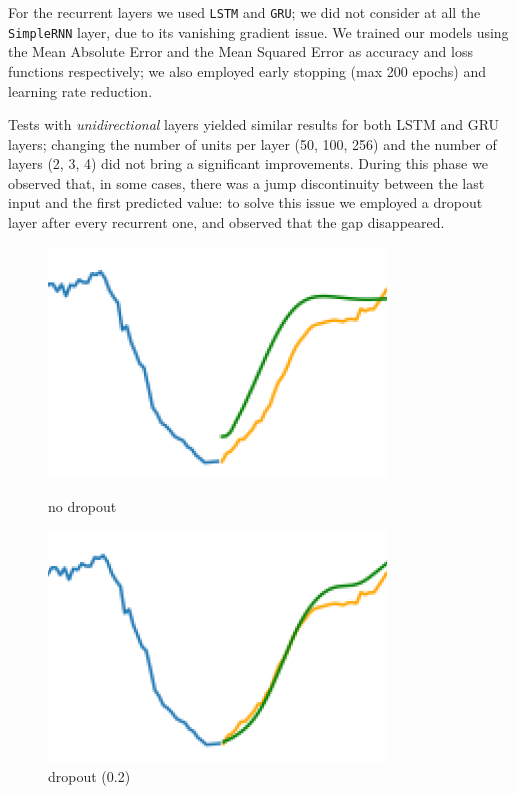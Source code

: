\documentclass[10.5pt,a4paper,twocolumn]{article}
\begin{document}
For the recurrent layers we used \texttt{LSTM} and \texttt{GRU};
we did not consider at all the \texttt{SimpleRNN} layer, due to its vanishing gradient issue.
We trained our models using the Mean Absolute Error and the Mean Squared Error as accuracy and loss 
functions respectively; we also employed early stopping (max 200 epochs) and learning rate reduction.

Tests with \textit{unidirectional} layers yielded similar results for both LSTM and GRU layers;
changing the number of units per layer (50, 100, 256) and the number of layers (2, 3, 4) did not 
bring a significant improvements. During this phase we observed that, in some cases, there was
a jump discontinuity between the last input and the first predicted value: to solve this issue
we employed a dropout layer after every recurrent one, and observed that the gap disappeared.

\begin{figure}[h]
    \centering
    \begin{minipage}[b]{0.45\linewidth}
        \centering
        \includegraphics[width=0.8\textwidth]{pics/nodropout.png} %
        \caption{no dropout}
    \end{minipage}\hfill
    \begin{minipage}[b]{0.45\linewidth}
        \centering
        \includegraphics[width=0.8\textwidth]{pics/withdropout.png} %
        \caption{dropout (0.2)}
    \end{minipage}
\end{figure}
\newpage
\end{document}

